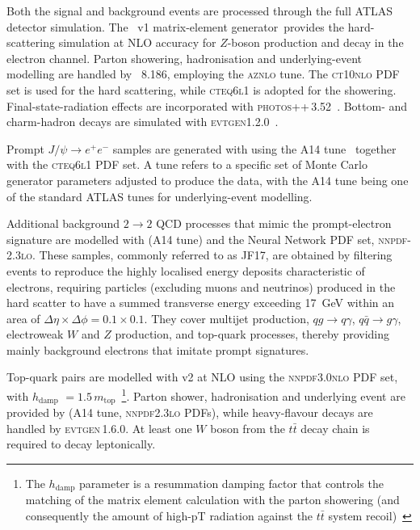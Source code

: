 Both the signal and background events are processed through the full ATLAS detector simulation.
The \powhegbox~v1 matrix-element generator\ provides the hard-scattering simulation at NLO accuracy for $Z$-boson production and decay in the electron channel.  Parton showering, hadronisation and underlying-event modelling are handled by \pythia~8.186, employing the \textsc{aznlo} tune. The \textsc{ct10nlo} PDF set is used for the hard scattering, while \textsc{cteq6l1} is adopted for the showering.
Final-state-radiation effects are incorporated with \textsc{photos++}\,3.52~\cite{davidson2015photosinterfacectechnical,Golonka_2006}.  Bottom- and charm-hadron decays are simulated with \textsc{evtgen}1.2.0~\cite{LANGE2001152}.

Prompt $J/\psi\!\to e^{+}e^{-}$ samples are generated with  using the A14 tune~\cite{A14} together with the \textsc{cteq6l1} PDF set. A tune refers to a specific set of Monte Carlo generator parameters adjusted to produce the data, with the A14 tune being one of the standard ATLAS tunes for underlying-event modelling.

Additional background $2\!\to\!2$ QCD processes that mimic the prompt-electron signature are modelled with  (A14 tune) and the Neural Network PDF set, \textsc{nnpdf}-\\{\small2.3}\textsc{lo}. 
These samples, commonly referred to as JF17, are obtained by filtering events to reproduce the highly localised energy deposits characteristic of electrons, requiring particles (excluding muons and neutrinos) produced in the hard scatter to have a summed transverse energy exceeding 17~GeV within an area of $\Delta\eta \times \Delta\phi = 0.1 \times 0.1$. 
They cover multijet production, $qg\rightarrow q\gamma$, $q\bar{q}\rightarrow g\gamma$, electroweak $W$ and $Z$ production, and top-quark processes, thereby providing mainly background electrons that imitate prompt signatures.

Top-quark pairs are modelled with \powhegbox v2 at NLO using the \textsc{nnpdf3.0nlo} PDF set, with $h_{\text{damp}}$ $=1.5\,m_{\text{top}}$~\footnote{The $h_{\text{damp}}$ parameter is a resummation damping factor that controls the matching of the matrix element calculation with the parton showering (and consequently the amount of high-pT radiation against the $t\bar{t}$ system recoil)~\cite{hdamp}}.
Parton shower, hadronisation and underlying event are provided by  (A14 tune, \textsc{nnpdf2.3lo} PDFs), while heavy-flavour decays are handled by \textsc{evtgen}\,1.6.0.  At least one $W$ boson from the $t\bar t$ decay chain is required to decay leptonically.

